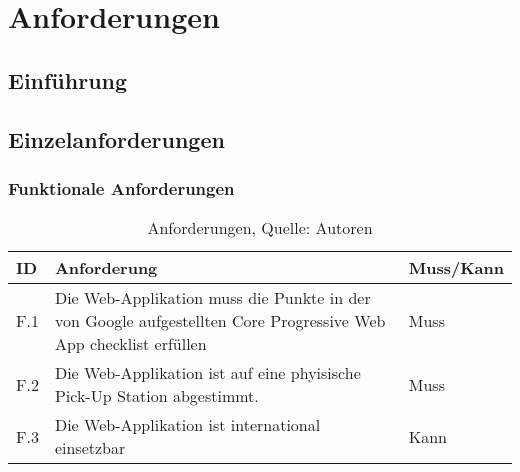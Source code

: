 \section{Anforderungen}\label{Anforderungen}
\subsection{Einführung}

\subsection{Einzelanforderungen}
\subsubsection{Funktionale Anforderungen}
\begin{table}[H]
    \setlength\extrarowheight{2pt} %
    \begin{tabularx}{\textwidth}{|l|X|l|}
        \hline
        \textbf{ID} &  \textbf{Anforderung} & \textbf{Muss/Kann}  \\
        \hline
        F.1 & Die Web-Applikation muss die Punkte in der von Google aufgestellten Core Progressive Web App checklist \cite{pwaChecklist} erfüllen& Muss \\
        \hline
        F.2 & Die Web-Applikation ist auf eine phyisische Pick-Up Station abgestimmt. & Muss \\
        \hline
        F.3 & Die Web-Applikation ist international einsetzbar & Kann \\
        \hline

    \end{tabularx}
    \caption{ \label{tbl: Funktionsanforderungen}Anforderungen, Quelle: Autoren}
\end{table}
